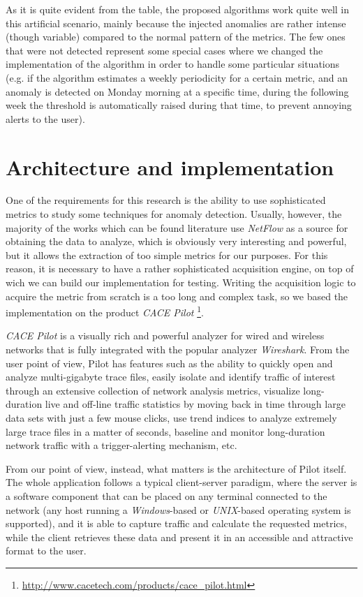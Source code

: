 \documentclass[12pt,a4paper,cucitura]{toptesi}
\begin{document}
As it is quite evident from the table, the proposed algorithms work quite well in this artificial scenario, mainly because the injected anomalies are rather intense (though variable) compared to the normal pattern of the metrics. The few ones that were not detected represent some special cases where we changed the implementation of the algorithm in order to handle some particular situations (e.g. if the algorithm estimates a weekly periodicity for a certain metric, and an anomaly is detected on Monday morning at a specific time, during the following week the threshold is automatically raised during that time, to prevent annoying alerts to the user).

\chapter{Architecture and implementation}
One of the requirements for this research is the ability to use sophisticated metrics to study some techniques for anomaly detection.
Usually, however, the majority of the works which can be found literature use \emph{NetFlow} as a source for obtaining the data to analyze, which is obviously very interesting and powerful, but it allows the extraction of too simple metrics for our purposes.
For this reason, it is necessary to have a rather sophisticated acquisition engine, on top of wich we can build our implementation for testing.
Writing the acquisition logic to acquire the metric from scratch is a too long and complex task, so we based the implementation on the product \emph{CACE Pilot} \footnote{\url{http://www.cacetech.com/products/cace_pilot.html}}.

\emph{CACE Pilot} is a visually rich and powerful analyzer for wired and wireless networks that is fully integrated with the popular analyzer \emph{Wireshark}.
From the user point of view, Pilot has features such as the ability to quickly open and analyze multi-gigabyte trace files, easily isolate and identify traffic of interest through an extensive collection of network analysis metrics, visualize long-duration live and off-line traffic statistics by moving back in time through large data sets with just a few mouse clicks, use trend indices to analyze extremely large trace files in a matter of seconds, baseline and monitor long-duration network traffic with a trigger-alerting mechanism, etc.

From our point of view, instead, what matters is the architecture of Pilot itself. 
The whole application follows a typical client-server paradigm, where the server is a software component that can be placed on any terminal connected to the network (any host running a \emph{Windows}-based or \emph{UNIX}-based operating system is supported), and it is able to capture traffic and calculate the requested metrics, while the client retrieves these data and present it in an accessible and attractive format to the user.
\end{document}

